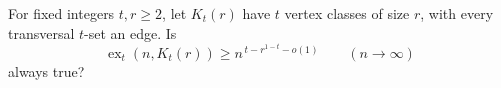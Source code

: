 For fixed integers $t,r\geq2$, let $K_t(r)$ have $t$ vertex classes of size $r$, with every transversal $t$-set an edge. Is
\[
\operatorname{ex}_t(n,K_t(r))\geq n^{\,t-r^{1-t}-o(1)}
\qquad(n\to\infty)
\]
always true?

